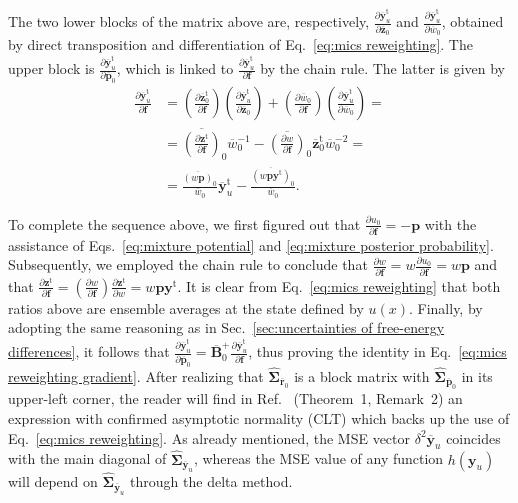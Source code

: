 \documentclass[
    journal=jctcce,
    layout=twocolumn
]{achemso}
\newcommand{\mt}[1]{\boldsymbol{\mathbf{#1}}}   %
\newcommand{\vt}[1]{\boldsymbol{\mathbf{#1}}}   %
\newcommand{\tr}[1]{#1^\text{t}}                %
\newcommand{\diff}[2]{\frac{\partial #2}{\partial #1}} %
\newcommand{\avg}[1]{\overline{#1}}             %
\begin{document}
The two lower blocks of the matrix above are, respectively, $\diff{\avg{\vt z}_0}{\tr{\avg{\vt y}}_u}$ and $\diff{\avg{w}_0}{\tr{\avg{\vt y}}_u}$, obtained by direct transposition and differentiation of Eq.~\eqref{eq:mics reweighting}. The upper block is $\diff{\avg{\vt p}_0}{\tr{\avg{\vt y}}_u}$, which is linked to $\diff{\vt f} {\tr{\avg{\vt y}}_u}$ by the chain rule. The latter is given by
\begin{equation*}
\begin{split}
\diff{\vt f}{\tr{\avg{\vt y}}_u} &= \left(\diff{\vt f}{\tr{\avg{\vt z}}_0}\right) \left(\diff{\avg{\vt z}_0} {\tr{\avg{\vt y}}_u}\right) + \left(\diff{\vt f}{{\avg{w}_0}}\right) \left(\diff{\avg{w}_0}{\tr{\avg{\vt y}}_u}\right) = \\
&= {{\avg{\left(\diff{\vt f}{\tr{\vt z}}\right)}_0}}{\avg{w}_0^{-1}} - {\avg{\left(\diff{\vt f}{w}\right)}_0} \tr{\avg{\vt z}}_0  {\avg{w}_0^{-2}} = \\
&= \frac{\avg{(w {\vt p})}_0}{\avg{w}_0} \tr{\avg{\vt y}}_u - \frac{\avg{(w{\vt p}\tr{\vt y})}_0}{\avg{w}_0}.
\end{split}
\end{equation*}

To complete the sequence above, we first figured out that $\diff{\vt f}{u_0} = -{\vt p}$ with the assistance of Eqs.~\eqref{eq:mixture potential} and \eqref{eq:mixture posterior probability}. Subsequently, we employed the chain rule to conclude that $\diff{\vt f}{w} = w \diff{\vt f}{u_0} = w \vt p$ and that $\diff{\vt f}{\tr{\vt z}} = \left(\diff{\vt f}{w}\right) \diff{w}{\tr{\vt z}} = w \vt p \tr{\vt y}$. It is clear from Eq.~\eqref{eq:mics reweighting} that both ratios above are ensemble averages at the state defined by $u(x)$. Finally, by adopting the same reasoning as in Sec.~\ref{sec:uncertainties of free-energy differences}, it follows that $\diff{\avg{\vt p}_0}{\tr{\avg{\vt y}}_u} = \avg{\mt B}_0^+ \diff{\vt f}{\tr{\avg{\vt y}}_u}$, thus proving the identity in Eq.~\eqref{eq:mics reweighting gradient}. After realizing that $\hat{\mt \Sigma}_{\avg{\vt r}_0}$ is a block matrix with $\hat{\mt \Sigma}_{\avg{\vt p}_0}$ in its upper-left corner, the reader will find in Ref.~ (Theorem~1, Remark~2) an expression with confirmed asymptotic normality (CLT) which backs up the use of Eq.~\eqref{eq:mics reweighting}. As already mentioned, the MSE vector $\delta^2 \avg{\vt y}_u$ coincides with the main diagonal of $\hat{\mt \Sigma}_{\avg{\vt y}_u}$, whereas the MSE value of any function $h(\vt y_u)$ will depend on $\hat{\mt \Sigma}_{\avg{\vt y}_u}$ through the delta method.
\end{document}
